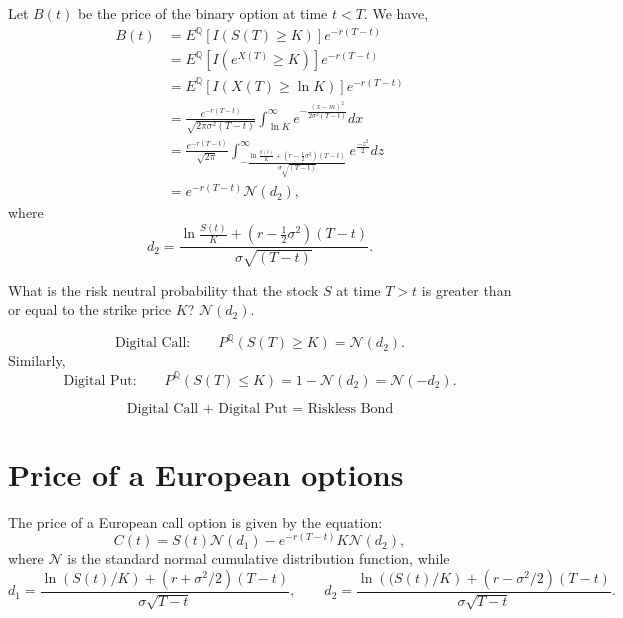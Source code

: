 \documentclass{amsart}
\theoremstyle{plain}
\numberwithin{equation}{section}
\begin{document}
Let $B(t)$ be the price of the binary option 
at time $t < T$. We have,
\begin{align*}
B(t) &= E^{\mathbb{Q}}[I\left(S(T)\geq K\right)]e^{-r(T-t)}\\
&= E^{\mathbb{Q}}[I\left(e^{X(T)}\geq K\right)]e^{-r(T-t)}\\
&= E^{\mathbb{Q}}[I\left(X(T)\geq \ln K\right)]e^{-r(T-t)}\\
&= \frac{e^{-r(T-t)}}{\sqrt{2\pi \sigma^2 (T-t)}} \int_{\ln K}^{\infty} e^{-\frac{\left(x-m\right)^2}{2\sigma^2(T-t)}} dx\\
&= \frac{e^{-r(T-t)}}{\sqrt{2\pi}} \int_{-\frac{\ln \frac{S(t)}{K} + (r-\frac{1}{2} \sigma^2)(T-t)}{\sigma \sqrt{(T-t)}}}^{\infty} e^\frac{-z^2}{2} dz\\
&= e^{-r(T-t)} \mathcal{N}(d_2),
\end{align*}
where 
\begin{equation*}
d_2 = \frac{\ln \frac{S(t)}{K} + (r-\frac{1}{2} \sigma^2)(T-t)}{\sigma \sqrt{(T-t)}}.
\end{equation*}

What is the risk neutral probability that the stock
$S$ at time $T>t$ is greater than or equal to the strike price $K$? 
$\mathcal{N}(d_2)$.

\begin{equation*}
\mbox{Digital Call:} \qquad P^{\mathbb{Q}}(S(T) \geq K) = \mathcal{N}(d_2).
\end{equation*}
Similarly,
\begin{equation*}
\mbox{Digital Put:} \qquad P^{\mathbb{Q}}(S(T) \leq K) = 1-\mathcal{N}(d_2)=\mathcal{N}(-d_2).
\end{equation*}

\begin{equation}
\mbox{Digital Call + Digital Put = Riskless Bond}
\end{equation}



\section*{Price of a European options}
The price of a European call option is 
given by the equation:
\begin{equation}
C(t) = S(t) \mathcal{N} (d_1) - e^{-r(T-t)} K \mathcal{N} (d_2),
\end{equation}
where $\mathcal{N}$ is the standard normal 
cumulative distribution function, while
\begin{equation}
d_1 = \frac{\ln\left(S(t)/K\right) + (r+\sigma^2/2)(T-t)}{\sigma \sqrt{T-t}}, \qquad 
d_2 = \frac{\ln\left((S(t)/K\right) + (r-\sigma^2/2)(T-t)}{\sigma \sqrt{T-t}}.
\end{equation}
\end{document}
